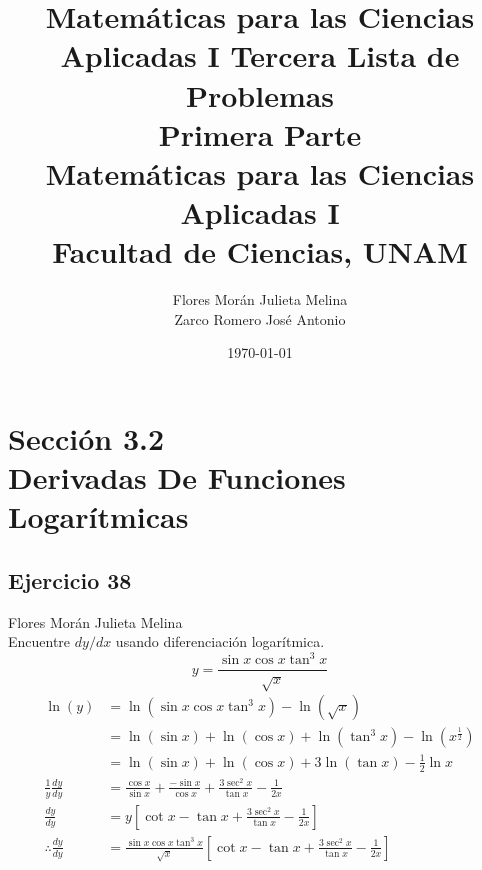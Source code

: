 \documentclass[12pt]{article}
\title{Matemáticas para las Ciencias Aplicadas I}
\title{
	Tercera Lista de Problemas \\
	\textbf{Primera  Parte} \\
	\vspace{1ex}
	\large Matemáticas para las Ciencias Aplicadas I \\
	Facultad de Ciencias, UNAM}
\date{\today}
\author{Flores Morán Julieta Melina \\ Zarco Romero José Antonio}
\begin{document}
\maketitle


\section{Sección 3.2 \\ Derivadas De Funciones Logarítmicas}
\subsection{Ejercicio 38} Flores Morán Julieta Melina \\

Encuentre $dy/dx$ usando diferenciación logarítmica.
\[
y=\frac{\sin{x}\cos{x}\tan^3{x}}{\sqrt{x}}
\]
\begin{equation*}
  \begin{split}
  \ln(y)
  &= \ln(\sin{x}\cos{x}\tan^3{x})-\ln(\sqrt{x}) \\
  &= \ln(\sin{x})+\ln(\cos{x})+\ln(\tan^3{x})-\ln \left(x^{\frac{1}{2}}\right) \\
  &= \ln(\sin{x})+\ln(\cos{x})+3\ln(\tan{x})-\frac{1}{2}\ln x \\
  \frac{1}{y}\frac{dy}{dy}
  &= \frac{\cos{x}}{\sin{x}} + \frac{-\sin{x}}{\cos{x}} + \frac{3\sec^2{x}}{\tan{x}} - \frac{1}{2x} \\
  \frac{dy}{dy}
  &= y \left[ \cot{x}-\tan{x} + \frac{3\sec^2{x}}{\tan{x}} - \frac{1}{2x} \right] \\
  \therefore \frac{dy}{dy}
  &= \frac{\sin{x}\cos{x}\tan^3{x}}{\sqrt{x}}
  \left[ \cot{x}-\tan{x} + \frac{3\sec^2{x}}{\tan{x}} - \frac{1}{2x} \right] \\
  \end{split}
\end{equation*}

\end{document}
